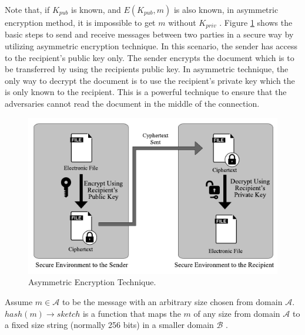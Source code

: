 Note that, if $K_{pub}$ is known, and $E(K_{pub},m)$ is also known, in asymmetric encryption method, it is impossible to get $m$ without $K_{priv}$ \cite{stallings2017cryptography}.
Figure \ref{fig:AssymmetricEncryption} shows the basic steps to send and receive messages between two parties in a secure way by utilizing asymmetric encryption technique. In this scenario, the sender has access to the recipient's public key only. The sender encrypts the document which is to be transferred by using the recipients public key. In asymmetric technique, the only way to decrypt the document is to use the recipient's private key which the is only known to the recipient. This is a powerful technique to ensure that the adversaries cannot read the document in the middle of the connection.

\begin{figure}
	\centering
	\includegraphics[width=\textwidth]{figs/asymmetricEncryption.pdf}
	\caption{Asymmetric Encryption Technique.}
	\label{fig:AssymmetricEncryption}
\end{figure}
\begin{defn}
	Assume $m \in \mathcal{A}$ to be the message with an arbitrary size chosen from domain $\mathcal{A}$. $hash(m)\rightarrow sketch$ is a function that maps the $m$ of any size from domain $\mathcal{A}$ to a fixed size string (normally 256 bits) in a smaller domain $\mathcal{B}$ \cite{aumasson2014thehash}.
\label{dfn:hash_function}
\end{defn}
